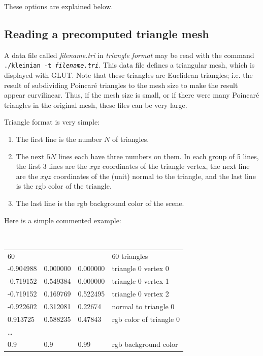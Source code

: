\documentclass[12pt]{article}
\begin{document}
These options are explained below.

\subsection{Reading a precomputed triangle mesh}

A data file called {\sl filename.tri} in {\em triangle format} may be read with
the command {\tt ./kleinian -t {\sl filename.tri}}. This data file defines a
triangular mesh, which is displayed with GLUT. Note that these triangles are
Euclidean triangles; i.e.\/ the result of subdividing Poincar\'e triangles to
the mesh size to make the result appear curvilinear. Thus, if the mesh size is
small, or if there were many Poincar\'e triangles in the original mesh,
these files can be very large.

Triangle format is very simple: 
\begin{enumerate}
\item{The first line is the number $N$ of triangles.}
\item{The next $5N$ lines each have three numbers on them. In each group of 5 lines,
the first 3 lines are the $xyz$ coordinates of the triangle vertex, the next
line are the $xyz$ coordinates of the (unit) normal to the triangle, and the
last line is the rgb color of the triangle.}
\item{The last line is the rgb background color of the scene.}
\end{enumerate}

Here is a simple commented example:

\begin{center}
{\tt
\begin{tabular}{llll}
60 & & & 60 triangles \\
-0.904988 & 0.000000 & 0.000000 & triangle 0 vertex 0 \\
-0.719152 & 0.549384 & 0.000000 & triangle 0 vertex 1 \\
-0.719152 & 0.169769 & 0.522495 & triangle 0 vertex 2 \\
-0.922602 & 0.312081 & 0.22674  & normal to triangle 0 \\
0.913725 & 0.588235 & 0.47843 & rgb color of triangle 0 \\
\dots & & & \\
0.9 & 0.9 & 0.99 & rgb background color \\
\end{tabular}
}
\end{center}
\end{document}
